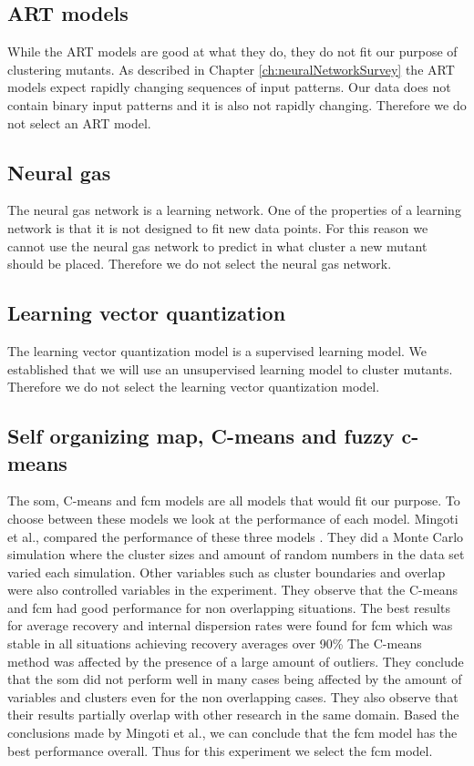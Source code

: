 \documentclass[../../main]{subfiles}
\begin{document}
\subsection{ART models}
While the ART models are good at what they do, they do not fit our purpose of clustering mutants.
As described in Chapter \ref{ch:neuralNetworkSurvey} the ART models expect rapidly changing sequences of input patterns.
Our data does not contain binary input patterns and it is also not rapidly changing.
Therefore we do not select an ART model.

\subsection{Neural gas}
The neural gas network is a learning network.
One of the properties of a learning network is that it is not designed to fit new data points\cite{supervisedUnsupervised}.
For this reason we cannot use the neural gas network to predict in what cluster a new mutant should be placed.
Therefore we do not select the neural gas network.

\subsection{Learning vector quantization}
The learning vector quantization model is a supervised learning model.
We established that we will use an unsupervised learning model to cluster mutants.
Therefore we do not select the learning vector quantization model.

\subsection{Self organizing map, C-means and fuzzy c-means}
\label{ch:topThreeModels}
The \acrfull{som}, C-means and \acrfull{fcm} models are all models that would fit our purpose. 
To choose between these models we look at the performance of each model.
Mingoti et al., compared the performance of these three models \cite{Mingoti2006ComparingAlgorithms}.
They did a Monte Carlo simulation where the cluster sizes and amount of random numbers in the data set varied each simulation\cite{Mingoti2006ComparingAlgorithms}.
Other variables such as cluster boundaries and overlap were also controlled variables in the experiment.
They observe that the C-means and \acrlong{fcm} had good performance for non overlapping situations\cite{Mingoti2006ComparingAlgorithms}.
The best results for average recovery and internal dispersion rates were found for \acrlong{fcm} which was stable in all situations achieving recovery averages over 90\%\cite{Mingoti2006ComparingAlgorithms}
The C-means method was affected by the presence of a large amount of outliers.
They conclude that the \acrshort{som} did not perform well in many cases being affected by the amount of variables and clusters even for the non overlapping cases\cite{Mingoti2006ComparingAlgorithms}.
They also observe  that their results partially overlap with other research in the same domain.
\newline
Based the conclusions made by Mingoti et al., we can conclude that the \acrshort{fcm} model has the best performance overall.
Thus for this experiment we select the \acrshort{fcm} model.
\end{document}

